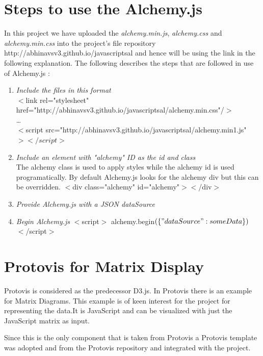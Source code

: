 \section{Steps to use the Alchemy.js}
 In this project we have uploaded the \textit{alchemy.min.js}, \textit{alchemy.css} and \textit{alchemy.min.css } into the project's file repository http://abhinavsv3.github.io/javascriptsal and hence will be using the link in the following explanation. 
The following describes the steps that are followed in use of Alchemy.js :
\begin{enumerate}

\item \textit{Include the files in this format}\\
$<$link rel="stylesheet" href="http://abhinavsv3.github.io/javascriptsal/alchemy.min.css"/$>$
\\
\ldots\\
$<$script src="http://abhinavsv3.github.io/javascriptsal/alchemy.min1.js"$></script>$

\item \textit{Include an element with "alchemy" ID as the id and class }\\
The alchemy class is used to apply styles while the alchemy id is used programatically. By default Alchemy.js looks for the alchemy div but this can be overridden.
$<$div class="alchemy" id="alchemy"$><$/div$>$

\item \textit{Provide Alchemy.js with a JSON dataSource}

\item \textit{Begin Alchemy.js}
$<$script$>$
  alchemy.begin$(\{"dataSource": someData\})$
$<$/script$>$



\end{enumerate}
\section{Protovis for Matrix Display}
Protovis is considered as the predecessor D3.js. In Protovis there is an example for Matrix Diagrams. This example is of keen interest for the project for representing the data.It is JavaScript and can be visualized with just the JavaScript matrix as input.
\par Since this is the only component that is taken from Protovis a Protovis template was adopted and from the Protovis repository and integrated with the project.

